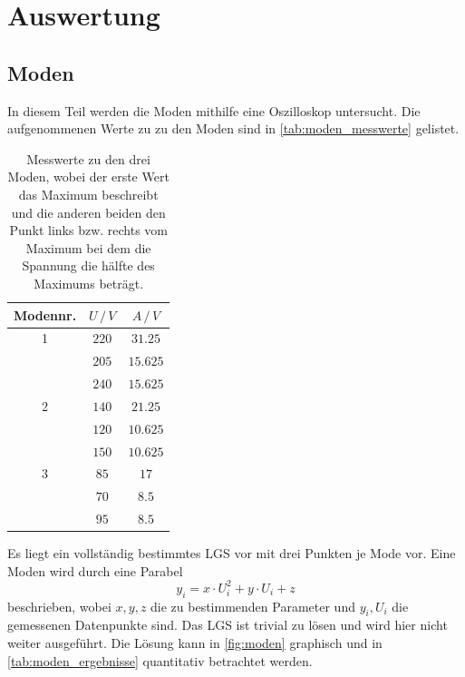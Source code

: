 \section{Auswertung}
\label{sec:Auswertung}

\subsection{Moden}
In diesem Teil werden die Moden mithilfe eine Oszilloskop untersucht.
Die aufgenommenen Werte zu zu den Moden sind in \autoref{tab:moden_messwerte} gelistet.
\begin{table}
    \centering
    \caption{Messwerte zu den drei Moden, wobei der erste Wert das Maximum beschreibt und die anderen beiden den Punkt links bzw. rechts vom Maximum bei dem die Spannung die hälfte des Maximums beträgt.}
    \begin{tabular}{c c c}
        \toprule
        Modennr. & $U \,/\, V$ & $A \,/\, V$ \\
        \midrule
        1 & $220$ & $31.25$ \\
        & $205$ & $15.625$ \\
        & $240$ & $15.625$ \\
        \hline
        2 & $140$ & $21.25$ \\
        & $120$ & $10.625$ \\
        & $150$ & $10.625$ \\
        \hline
        3 & $85$ & $17$ \\
        & $70$ & $8.5$ \\
        & $95$ & $8.5$ \\
        \bottomrule
    \end{tabular}
    \label{tab:moden_messwerte}
\end{table}
\FloatBarrier
Es liegt ein vollständig bestimmtes LGS vor mit drei Punkten je Mode vor.
Eine Moden wird durch eine Parabel
\begin{equation*}
    y_i = x \cdot U_i^2 + y \cdot U_i + z
\end{equation*}
beschrieben, wobei $x, y, z$ die zu bestimmenden Parameter und $y_i, U_i$ die gemessenen Datenpunkte sind.
Das LGS ist trivial zu lösen und wird hier nicht weiter ausgeführt.
Die Lösung kann in \autoref{fig:moden} graphisch und in \autoref{tab:moden_ergebnisse} quantitativ betrachtet werden.
